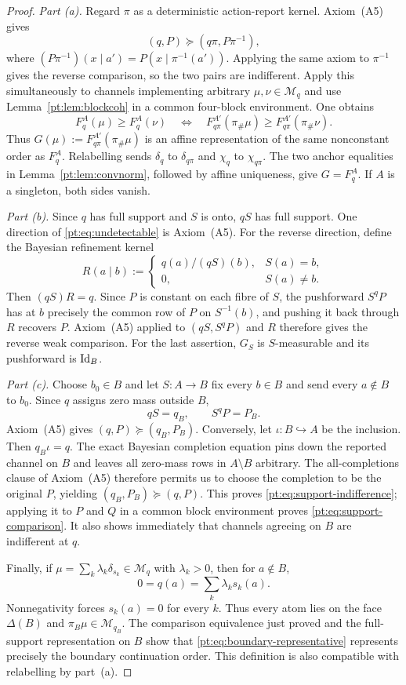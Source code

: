 \begin{proof}
\emph{Part (a).}
Regard $\pi$ as a deterministic action-report kernel.  Axiom~\textup{(A5)}
gives
\[
 (q,P)\succeq(q\pi,P\pi^{-1}),
\]
where $(P\pi^{-1})(x\mid a')=P(x\mid\pi^{-1}(a'))$.  Applying the same axiom
to $\pi^{-1}$ gives the reverse comparison, so the two pairs are indifferent.
Apply this simultaneously to channels implementing arbitrary
$\mu,\nu\in\mathcal M_q$ and use Lemma~\ref{pt:lem:blockcoh} in a common
four-block environment.  One obtains
\[
 F_q^A(\mu)\ge F_q^A(\nu)
 \quad\Longleftrightarrow\quad
 F_{q\pi}^{A'}(\pi_\#\mu)
 \ge F_{q\pi}^{A'}(\pi_\#\nu).
\]
Thus $G(\mu):=F_{q\pi}^{A'}(\pi_\#\mu)$ is an affine representation of the
same nonconstant order as $F_q^A$.  Relabelling sends
$\delta_q$ to $\delta_{q\pi}$ and $\chi_q$ to $\chi_{q\pi}$.  The two anchor
equalities in Lemma~\ref{pt:lem:convnorm}, followed by affine uniqueness, give
$G=F_q^A$.  If $A$ is a singleton, both sides vanish.

\emph{Part (b).}
Since $q$ has full support and $S$ is onto, $qS$ has full support.  One
direction of \eqref{pt:eq:undetectable} is Axiom~\textup{(A5)}.  For the
reverse direction, define the Bayesian refinement kernel
\[
 R(a\mid b):=
 \begin{cases}
 q(a)/(qS)(b),&S(a)=b,\\
 0,&S(a)\ne b.
 \end{cases}
\]
Then $(qS)R=q$.  Since $P$ is constant on each fibre of $S$, the pushforward
$S^qP$ has at $b$ precisely the common row of $P$ on $S^{-1}(b)$, and pushing
it back through $R$ recovers $P$.  Axiom~\textup{(A5)} applied to
$(qS,S^qP)$ and $R$ therefore gives the reverse weak comparison.  For the
last assertion, $G_S$ is $S$-measurable and its pushforward is $\operatorname{Id}_B$.

\emph{Part (c).}
Choose $b_0\in B$ and let $S:A\to B$ fix every $b\in B$ and send every
$a\notin B$ to $b_0$.  Since $q$ assigns zero mass outside $B$,
\[
 qS=q_B,
 \qquad
 S^qP=P_B.
\]
Axiom~\textup{(A5)} gives $(q,P)\succeq(q_B,P_B)$.  Conversely, let
$\iota:B\hookrightarrow A$ be the inclusion.  Then $q_B\iota=q$.  The exact
Bayesian completion equation pins down the reported channel on $B$ and leaves
all zero-mass rows in $A\setminus B$ arbitrary.  The all-completions clause of
Axiom~\textup{(A5)} therefore permits us to choose the completion to be the
original $P$, yielding $(q_B,P_B)\succeq(q,P)$.  This proves
\eqref{pt:eq:support-indifference}; applying it to $P$ and $Q$ in a common
block environment proves \eqref{pt:eq:support-comparison}.  It also shows
immediately that channels agreeing on $B$ are indifferent at $q$.

Finally, if $\mu=\sum_k\lambda_k\delta_{s_k}\in\mathcal M_q$ with
$\lambda_k>0$, then for $a\notin B$,
\[
 0=q(a)=\sum_k\lambda_ks_k(a).
\]
Nonnegativity forces $s_k(a)=0$ for every $k$.  Thus every atom lies on the
face $\Delta(B)$ and $\pi_B\mu\in\mathcal M_{q_B}$.  The comparison
equivalence just proved and the full-support representation on $B$ show that
\eqref{pt:eq:boundary-representative} represents precisely the boundary
continuation order.  This definition is also compatible with relabelling by
part~(a).
\end{proof}

